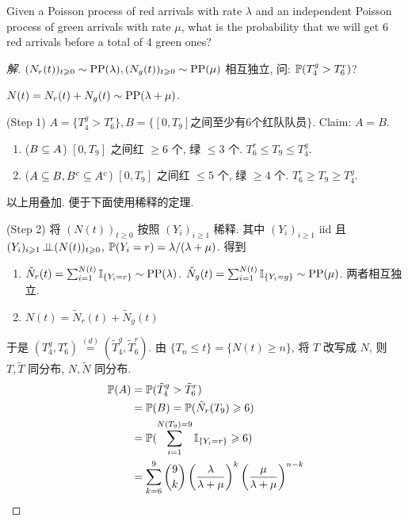 \begin{example}
    Given a Poisson process of red arrivals with rate $\lambda$ and an independent Poisson process of green arrivals with rate $\mu$, what is the probability that we will get $6$ red arrivals before a total of $4$ green ones?
\end{example}
\begin{proof}[解]
    $(N_r(t))_{t\geqslant 0}\sim\operatorname{PP}(\lambda), (N_g(t))_{t\geqslant 0}\sim \operatorname{PP}(\mu)$ 相互独立, 问: $\mathbb{P}(T_4^g>T_6^r)$?

    $N(t)=N_r(t)+N_g(t)\sim \operatorname{PP}(\lambda +\mu)$.
    
    (Step 1) $A=\{T_4^g>T_6^r\}, B=\{[0,T_9]\text{之间至少有}6\text{个红队队员}\}$. Claim: $A=B$.
        \begin{enumerate}
            \item ($B\subseteq A$) $[0,T_9]$ 之间红 $\geq 6$ 个, 绿 $\leq 3$ 个. $T_6^r\leq T_9\leq T_4^g$.
            \item ($A\subseteq B, B^c\subseteq A^c$) $[0,T_9]$ 之间红 $\leq 5$ 个, 绿 $\geq 4$ 个. $T_6^r\geq T_9\geq T_4^g$.
        \end{enumerate}
        以上用叠加. 便于下面使用稀释的定理.
        
  (Step 2) 将 $(N(t))_{t\geq 0}$ 按照 $(Y_i)_{i\geq 1}$ 稀释. 其中 $(Y_i)_{i\geq 1}$ iid 且 $(Y_i)_{i\geqslant 1}\operatorname{\perp\!\!\!\perp} (N(t))_{t\geqslant 0}$, $\mathbb{P}(Y_i=r)=\lambda/(\lambda+\mu)$. 得到
        \begin{enumerate}
            \item $\tilde{N}_r(t)=\sum_{i=1}^{N(t)}\mathbb I_{\{Y_i=r\}}\sim\operatorname{PP}(\lambda)$. $\tilde{N}_g(t)=\sum_{i=1}^{N(t)}\mathbb I_{\{Y_i=g\}}\sim\operatorname{PP}(\mu)$. 两者相互独立.
            \item $N(t)=\tilde{N}_r(t)+\tilde{N}_g(t)$
        \end{enumerate}
        于是 $(T_4^g, T_6^r)\overset{(d)}{=}(\tilde{T}_4^g,\tilde{T}_6^r)$. 由 $\{T_n\leq t\}=\{N(t)\geq n\}$, 将 $T$ 改写成 $N$, 则 $T,\tilde{T}$ 同分布, $N,\tilde{N}$ 同分布.
        \[
        \begin{aligned}
            \mathbb{P}(A) &=\mathbb{P}(\tilde{T}_4^g>\tilde{T}_6^r)\\
            &=\mathbb{P}(B)=\mathbb{P}(\tilde{N}_r(T_9)\geqslant 6)\\
            &=\mathbb{P}(\sum_{i=1}^{N(T_9)=9}\mathbb I_{\{Y_i=r\}}\geqslant 6)\\
            &=\sum_{k=6}^9\binom{9}{k}\left(\frac{\lambda}{\lambda+\mu}\right)^{k}\left(\frac{\mu}{\lambda+\mu}\right)^{n-k}
        \end{aligned}
        \]
\end{proof}

